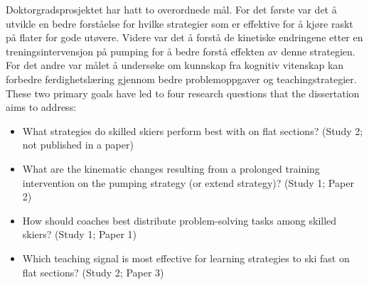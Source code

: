Doktorgradsprosjektet har hatt to overordnede mål. For det første var det å utvikle en bedre forståelse for hvilke strategier som er effektive for å kjøre raskt på flater for gode utøvere. Videre var det å forstå de kinetiske endringene etter en treningsintervensjon på pumping for å bedre forstå effekten av denne strategien. For det andre var målet å undersøke om kunnskap fra kognitiv vitenskap kan forbedre ferdighetslæring gjennom bedre problemoppgaver og teachingstrategier. These two primary goals have led to four research questions that the dissertation aims to address:

\begin{itemize}
    \item What strategies do skilled skiers perform best with on flat sections? (Study 2; not published in a paper)
    \item What are the kinematic changes resulting from a prolonged training intervention on the pumping strategy (or extend strategy)? (Study 1; Paper 2)
    \item How should coaches best distribute problem-solving tasks among skilled skiers? (Study 1; Paper 1)
    \item Which teaching signal is most effective for learning strategies to ski fast on flat sections? (Study 2; Paper 3)
\end{itemize}










